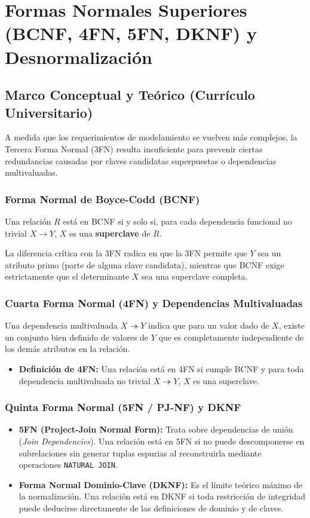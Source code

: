 \chapter{Formas Normales Superiores (BCNF, 4FN, 5FN, DKNF) y Desnormalizaci\'on}
\label{cap:formas_superiores_desnormalizacion}

\section{Marco Conceptual y Te\'orico (Curr\'iculo Universitario)}

A medida que los requerimientos de modelamiento se vuelven m\'as complejos, la Tercera Forma Normal (3FN) resulta insuficiente para prevenir ciertas redundancias causadas por claves candidatas superpuestas o dependencias multivaluadas.

\subsection{Forma Normal de Boyce-Codd (BCNF)}
Una relaci\'on $R$ est\'a en BCNF si y solo si, para cada dependencia funcional no trivial $X \rightarrow Y$, $X$ es una \textbf{superclave} de $R$. 

La diferencia cr\'itica con la 3FN radica en que la 3FN permite que $Y$ sea un atributo primo (parte de alguna clave candidata), mientras que BCNF exige estrictamente que el determinante $X$ sea una superclave completa.

\subsection{Cuarta Forma Normal (4FN) y Dependencias Multivaluadas}
Una dependencia multivaluada $X \twoheadrightarrow Y$ indica que para un valor dado de $X$, existe un conjunto bien definido de valores de $Y$ que es completamente independiente de los dem\'as atributos en la relaci\'on.
\begin{itemize}
    \item \textbf{Definici\'on de 4FN:} Una relaci\'on est\'a en 4FN si cumple BCNF y para toda dependencia multivaluada no trivial $X \twoheadrightarrow Y$, $X$ es una superclave.
\end{itemize}

\subsection{Quinta Forma Normal (5FN / PJ-NF) y DKNF}
\begin{itemize}
    \item \textbf{5FN (Project-Join Normal Form):} Trata sobre dependencias de uni\'on (\textit{Join Dependencies}). Una relaci\'on est\'a en 5FN si no puede descomponerse en subrelaciones sin generar tuplas espurias al reconstruirla mediante operaciones \texttt{NATURAL JOIN}.
    \item \textbf{Forma Normal Dominio-Clave (DKNF):} Es el l\'imite te\'orico m\'aximo de la normalizaci\'on. Una relaci\'on est\'a en DKNF si toda restricci\'on de integridad puede deducirse directamente de las definiciones de dominio y de claves.
\end{itemize}

